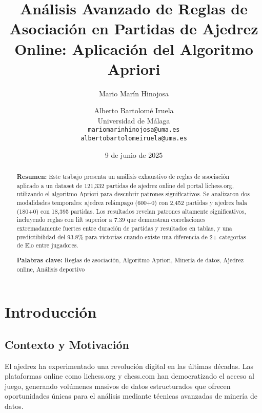 \documentclass[11pt,a4paper]{article}
\begin{document}
\title{\textbf{An\'alisis Avanzado de Reglas de Asociaci\'on en Partidas de Ajedrez Online: Aplicaci\'on del Algoritmo Apriori}}

\author{Mario Mar\'in Hinojosa \and Alberto Bartolom\'e Iruela\\
\small Universidad de M\'alaga\\
\small \texttt{mariomarinhinojosa@uma.es}\\
\small \texttt{albertobartolomeiruela@uma.es}}

\date{9 de junio de 2025}

\maketitle

\begin{abstract}
\noindent \textbf{Resumen:} Este trabajo presenta un an\'alisis exhaustivo de reglas de asociaci\'on aplicado a un dataset de 121,332 partidas de ajedrez online del portal lichess.org, utilizando el algoritmo Apriori para descubrir patrones significativos. Se analizaron dos modalidades temporales: ajedrez rel\'ampago (600+0) con 2,452 partidas y ajedrez bala (180+0) con 18,395 partidas. Los resultados revelan patrones altamente significativos, incluyendo reglas con lift superior a 7.39 que demuestran correlaciones extremadamente fuertes entre duraci\'on de partidas y resultados en tablas, y una predictibilidad del 93.8\% para victorias cuando existe una diferencia de 2+ categor\'ias de Elo entre jugadores.

\noindent \textbf{Palabras clave:} Reglas de asociaci\'on, Algoritmo Apriori, Miner\'ia de datos, Ajedrez online, An\'alisis deportivo
\end{abstract}

\tableofcontents
\newpage

\section{Introducci\'on}

\subsection{Contexto y Motivaci\'on}

El ajedrez ha experimentado una revoluci\'on digital en las \'ultimas d\'ecadas. Las plataformas online como lichess.org y chess.com han democratizado el acceso al juego, generando vol\'umenes masivos de datos estructurados que ofrecen oportunidades \'unicas para el an\'alisis mediante t\'ecnicas avanzadas de miner\'ia de datos.
\end{document}
